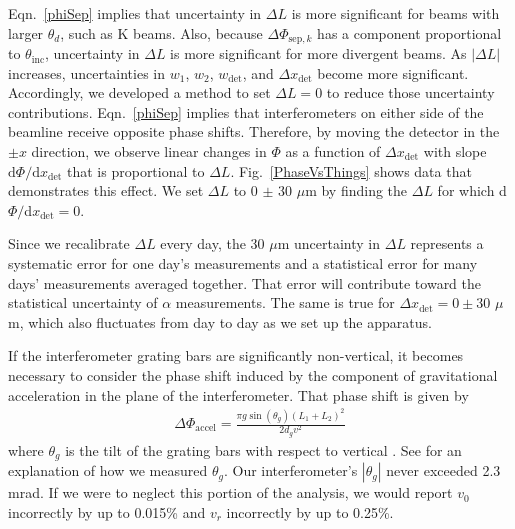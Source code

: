 \documentclass[twocolumn,pra,showpacs,superscriptaddress,longbibliography]{revtex4-1}   %
\newcommand{\figref}[1]{Fig.~\ref{#1}}
\newcommand{\eqnref}[1]{Eqn.~\eqref{#1}}
\newcommand{\dphisepk}{\Delta\Phi_{\mathrm{sep},k}}
\newcommand{\dphiaccel}{\Delta\Phi_{\mathrm{accel}}}
\begin{document}
\eqnref{phiSep} implies that uncertainty in $\Delta L$ is more significant for beams with larger $\theta_d$, such as K beams.
Also, because $\dphisepk$ has a component proportional to $\theta_{\mathrm{inc}}$, uncertainty in $\Delta L$ is more significant for more divergent beams.
As $|\Delta L|$ increases, uncertainties in $w_1$, $w_2$, $w_{\mathrm{det}}$, and $\Delta x_{\mathrm{det}}$ become more significant. Accordingly, we developed a method to set $\Delta L = 0$ to reduce those uncertainty contributions. 
\eqnref{phiSep} implies that interferometers on either side of the beamline receive opposite phase shifts. 
Therefore, by moving the detector in the $\pm x$ direction, we  observe linear changes in $\Phi$ as a function of $\Delta x_{\mathrm{det}}$ with slope $\mathrm{d}\Phi/\mathrm{d}x_{\mathrm{det}}$ that is proportional to $\Delta L$.
\figref{PhaseVsThings} shows data that demonstrates this effect.
We set $\Delta L$ to 0 $\pm$ 30 $\mu$m by finding the $\Delta L$ for which d$\Phi/$d$x_{\mathrm{det}} = 0$.

Since we recalibrate $\Delta L$ every day, the 30 $\mu$m uncertainty in $\Delta L$ represents a systematic error for one day's measurements and a statistical error for many days' measurements averaged together. That error will contribute toward the statistical uncertainty of $\alpha$ measurements.
The same is true for $\Delta x_{\mathrm{det}} = 0 \pm 30$ $\mu$m, which also fluctuates from day to day as we set up the apparatus.

If the interferometer grating bars are significantly non-vertical, it becomes necessary to consider the phase shift induced by the component of gravitational acceleration in the plane of the interferometer. That phase shift is given by
\begin{align}
	\dphiaccel = \frac{\pi g\sin({\theta_g})(L_1+L_2)^2}{2d_g v^2}
	\label{phiAccel}
\end{align}
where $\theta_g$ is the tilt of the grating bars with respect to vertical \cite{Greenberg2014,Trubko2015a}. See \cite{Greenberg2014} for an explanation of how we measured $\theta_g$.
Our interferometer's $|\theta_g|$ never exceeded 2.3 mrad. If we were to neglect this portion of the analysis, we would report $v_0$ incorrectly by up to 0.015\% and $v_r$ incorrectly by up to 0.25\%.
\end{document}
